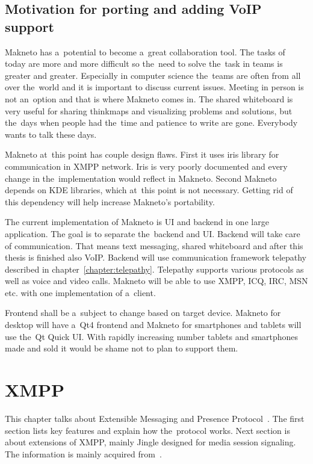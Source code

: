 \section{Motivation for porting and adding VoIP support}
Makneto has a~potential to become a~great collaboration tool. The tasks of today are more and more difficult so the~need to solve the~task in teams is greater and greater. Especially in computer science the~teams are often from all over the~world and it is important to discuss current issues. Meeting in person is not an~option and that is where Makneto comes in. The shared whiteboard is very useful for sharing thinkmaps and visualizing problems and solutions, but the~days when people had the~time and patience to write are gone. Everybody wants to talk these days.  

Makneto at~this point has couple design flaws. First it uses iris library for communication in XMPP network. Iris is very poorly documented and every change in the~implementation would reflect in Makneto. Second Makneto depends on KDE libraries, which at~this point is not necessary. Getting rid of this dependency will help increase Makneto's portability. 

The current implementation of Makneto is UI and backend in one large application. The goal is to separate the~backend and UI. Backend will take care of communication. That means text messaging, shared whiteboard and after this thesis is finished also VoIP. Backend will use communication framework telepathy described in chapter~\ref{chapter:telepathy}. Telepathy supports various protocols as well as voice and video calls. Makneto will be able to use XMPP, ICQ, IRC, MSN etc. with one implementation of a~client.

Frontend shall be a~subject to change based on target device. Makneto for desktop will have a~Qt4 frontend and Makneto for smartphones and tablets will use the~Qt Quick UI. With rapidly increasing number tablets and smartphones made and sold it would be shame not to plan to support them.  




\chapter{XMPP}\label{chapter:xmpp}
This chapter talks about Extensible Messaging and Presence Protocol~\cite{xmpp}. The first section lists key features and explain how the~protocol works. Next section is about extensions of XMPP, mainly Jingle designed for media session signaling. The information is mainly acquired from~\cite{xmppBook,xmppCoreRFC,xmppIMRFC}.

